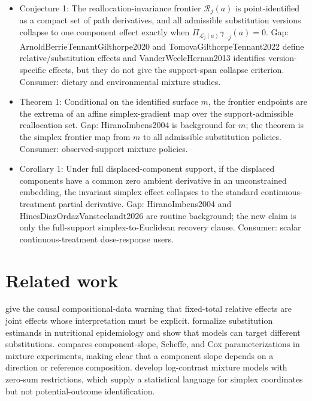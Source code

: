 \documentclass[11pt]{article}
\theoremstyle{definition}
\theoremstyle{plain}
\theoremstyle{remark}
\begin{document}
\begin{itemize}[leftmargin=1.8em]
\item Conjecture 1: The reallocation-invariance frontier \(\mathcal{R}_j(a)\) is point-identified as a compact set of path derivatives, and all admissible substitution versions collapse to one component effect exactly when \(\Pi_{\mathcal{L}_j(a)}\gamma_{-j}(a)=0\). Gap: ArnoldBerrieTennantGilthorpe2020 and TomovaGilthorpeTennant2022 define relative/substitution effects and VanderWeeleHernan2013 identifies version-specific effects, but they do not give the support-span collapse criterion. Consumer: dietary and environmental mixture studies.
\item Theorem 1: Conditional on the identified surface \(m\), the frontier endpoints are the extrema of an affine simplex-gradient map over the support-admissible reallocation set. Gap: HiranoImbens2004 is background for \(m\); the theorem is the simplex frontier map from \(m\) to all admissible substitution policies. Consumer: observed-support mixture policies.
\item Corollary 1: Under full displaced-component support, if the displaced components have a common zero ambient derivative in an unconstrained embedding, the invariant simplex effect collapses to the standard continuous-treatment partial derivative. Gap: HiranoImbens2004 and HinesDiazOrdazVansteelandt2026 are routine background; the new claim is only the full-support simplex-to-Euclidean recovery clause. Consumer: scalar continuous-treatment dose-response users.
\end{itemize}

\section{Related work}
\citet{ArnoldBerrieTennantGilthorpe2020} give the causal compositional-data warning that fixed-total relative effects are joint effects whose interpretation must be explicit. \citet{TomovaGilthorpeTennant2022} formalize substitution estimands in nutritional epidemiology and show that models can target different substitutions. \citet{Piepel2006} compares component-slope, Scheffe, and Cox parameterizations in mixture experiments, making clear that a component slope depends on a direction or reference composition. \citet{AitchisonBaconShone1984} develop log-contrast mixture models with zero-sum restrictions, which supply a statistical language for simplex coordinates but not potential-outcome identification.
\end{document}
